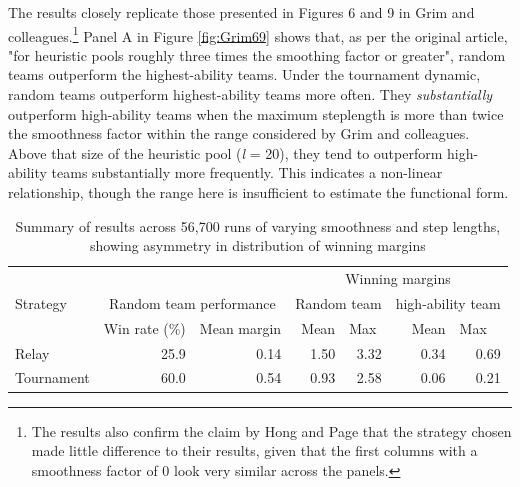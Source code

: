  The results closely replicate those presented in Figures 6 and 9 in Grim and colleagues.\footnote{The results also confirm the claim by Hong and Page that the strategy chosen made little difference to their results, given that the first columns with a smoothness factor of 0 look very similar across the panels.} Panel A in Figure \ref{fig:Grim69} shows that, as per the original article, "for heuristic pools roughly three times the smoothing factor or greater", random teams outperform the highest-ability teams. Under the tournament dynamic, random teams outperform highest-ability teams more often. They \textit{substantially} outperform high-ability teams when the maximum steplength is more than twice the smoothness factor within the range considered by Grim and colleagues. Above that size of the heuristic pool (\textit{l} = 20), they tend to outperform high-ability teams substantially more frequently. This indicates a non-linear relationship, though the range here is insufficient to estimate the functional form. \\
 
 \begin{table}
  \centering
  \caption{Summary of results across 56,700 runs of varying smoothness and step lengths, showing asymmetry in distribution of winning margins}
  \label{tab:win_comp}
\begin{tabular}{lrrrrrr}
  \toprule
  \multicolumn{3}{c}{}& \multicolumn{4}{c|}{Winning margins}\\
  Strategy & \multicolumn{2}{|c|}{Random team performance} & \multicolumn{2}{l|}{Random team} & \multicolumn{2}{l|}{high-ability team}\\
       &  \multicolumn{1}{|l}{Win rate (\%)} &  \multicolumn{1}{l|}{Mean margin} &  Mean &  \multicolumn{1}{l|}{Max} &  Mean &  \multicolumn{1}{l|}{Max} \\
  \midrule
       Relay &          25.9 &            0.14 &         1.50 &        3.32 &       0.34 &      0.69 \\
   Tournament &          60.0 &            0.54 &         0.93 &        2.58 &       0.06 &      0.21 \\
  \bottomrule
  \end{tabular}
\end{table} 
 

